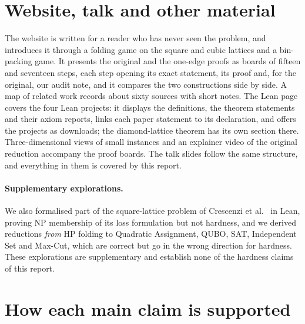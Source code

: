 \documentclass[11pt,letterpaper]{article}
\theoremstyle{definition}
\theoremstyle{remark}
\begin{document}
\section{Website, talk and other material}\label{sec:site}

The website is written for a reader who has never seen the problem, and introduces it through a
folding game on the square and cubic lattices and a bin-packing game. It presents the original and
the one-edge proofs as boards of fifteen and seventeen steps, each step opening its exact statement,
its proof and, for the original, our audit note, and it compares the two constructions side by
side. A map of related work records about sixty sources with short notes. The Lean page covers the
four Lean projects: it displays the definitions, the theorem statements and their axiom reports,
links each paper statement to its declaration, and offers the projects as downloads; the
diamond-lattice theorem has its own section there. Three-dimensional views of small instances and an
explainer video of the original reduction accompany the proof boards. The talk slides follow the
same structure, and everything in them is covered by this report.

\paragraph{Supplementary explorations.}
We also formalised part of the square-lattice problem of Crescenzi et al.~\cite{CGPPY98} in Lean,
proving NP membership of its loss formulation but not hardness, and we derived reductions
\emph{from} HP folding to Quadratic Assignment, QUBO, SAT, Independent Set and Max-Cut, which are
correct but go in the wrong direction for hardness. These explorations are supplementary and
establish none of the hardness claims of this report.

\section{How each main claim is supported}\label{sec:claims}
\end{document}
